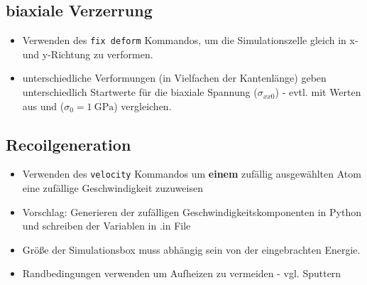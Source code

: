 \documentclass[a4paper, 10pt, 
               numbers=noenddot, toc=graduated,
               headsepline=true, footsepline=true,
               twoside=false, titlepage=true, 
               bibliography=totoc]{scrartcl}
\begin{document}
\subsection{biaxiale Verzerrung}
	\begin{itemize}
		\item Verwenden des \texttt{fix deform} Kommandos, um die Simulationszelle gleich in x- und y-Richtung zu verformen.
		\item unterschiedliche Verformungen (in Vielfachen der Kantenlänge) geben unterschiedlich Startwerte für die biaxiale Spannung ($\sigma_{xx0}$) - evtl. mit Werten aus \cite{Mayr2005} und \cite{Mayr2003} ($\sigma_0 = \SI{1}{\giga\pascal}$) vergleichen.
	\end{itemize}

\subsection{Recoilgeneration}
	\begin{itemize}
		\item Verwenden des \texttt{velocity} Kommandos um \textbf{einem} zufällig ausgewählten Atom eine zufällige Geschwindigkeit zuzuweisen
		\item Vorschlag: Generieren der zufälligen Geschwindigkeitskomponenten in Python und schreiben der Variablen in .in File
		\item Größe der Simulationsbox muss abhängig sein von der eingebrachten Energie.
		\item Randbedingungen verwenden um Aufheizen zu vermeiden - vgl. Sputtern
	\end{itemize}



\end{document}
